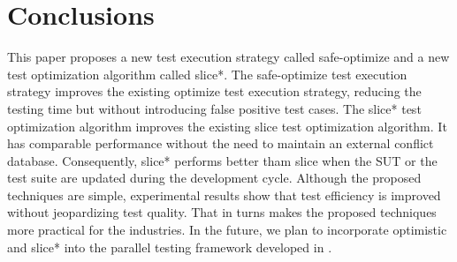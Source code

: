 \documentclass[authoryear,preprint,12pt]{elsarticle}
\begin{document}
\section{Conclusions}
   \label{conclusions}
This paper proposes a new test execution strategy called {\sc safe-optimize} and 
a new test optimization algorithm called {\sc slice*}.
The {\sc safe-optimize} test execution strategy improves the existing 
{\sc optimize} test execution strategy, reducing the testing time but without introducing false positive test cases.
The {\sc slice*} test optimization algorithm improves the existing 
{\sc slice} test optimization algorithm.
It has comparable performance without the need to maintain an external conflict database.
Consequently, {\sc slice*} performs better tham {\sc slice} when the SUT or the test suite are updated during the development cycle.
Although the proposed techniques are simple,
experimental results show that test efficiency is improved without jeopardizing test quality.
That in turns makes the proposed techniques more practical for the industries.
In the future, we plan to incorporate {\sc optimistic} and {\sc slice*} into the parallel testing framework developed in \cite{vldb, vldbj}.




\end{document}
